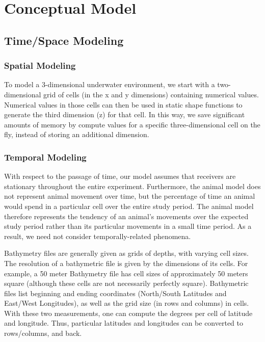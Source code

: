 \section{Conceptual Model}
\label{conceptualModel}
\subsection{Time/Space Modeling}
\label{timeSpaceModel}
\subsubsection{Spatial Modeling}
\label{spatialModeling}
To model a 3-dimensional underwater environment, we start with a two-dimensional grid of cells (in the x and y dimensions) containing numerical values.  Numerical values in those cells can then be used in static shape functions to generate the third dimension (z) for that cell.  In this way, we save significant amounts of memory by compute values for a specific three-dimensional cell on the fly, instead of storing an additional dimension.  

\subsubsection{Temporal Modeling}
\label{temporalModeling}
With respect to the passage of time, our model assumes that receivers are stationary throughout the entire experiment.  Furthermore, the animal model does not represent animal movement over time, but the percentage of time an animal would spend in a particular cell over the entire study period.  The animal model therefore represents the tendency of an animal's movements over the expected study period rather than its particular movements in a small time period.  As a result, we need not consider temporally-related phenomena. 

Bathymetry files are generally given as grids of depths, with varying cell sizes.  The resolution of a bathymetric file is given by the dimensions of its cells.  For example, a 50 meter Bathymetry file has cell sizes of approximately 50 meters square (although these cells are not necessarily perfectly square).  Bathymetric files list beginning and ending coordinates (North/South Latitudes and East/West Longitudes), as well as the grid size (in rows and columns) in cells.  With these two measurements, one can compute the degrees per cell of latitude and longitude.  Thus, particular latitudes and longitudes can be converted to rows/columns, and back.  


